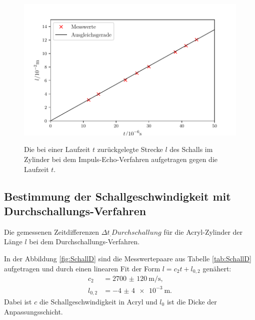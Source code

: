 \begin{figure}
	\centering
	\caption{Die bei einer Laufzeit $t$ zurückgelegte Strecke $l$ des Schalls im Zylinder bei dem Impuls-Echo-Verfahren aufgetragen gegen die Laufzeit $t$.}
	\includegraphics[width=\linewidth-70pt,height=\textheight-70pt,keepaspectratio]{content/images/Schallgeschwindigkeit.pdf}
	\label{fig:SchallIE}
\end{figure}

\subsection{Bestimmung der Schallgeschwindigkeit mit Durchschallungs-Verfahren}

\begin{table}
	\centering
	\caption{Die gemessenen Zeitdifferenzen $\Delta t_.{Durchschallung}$ für die Acryl-Zylinder der Länge $l$ bei dem Durchschallungs-Verfahren.}
	
	\label{tab:SchallD}
\end{table}

\noindent In der Abbildung \ref{fig:SchallD} sind die Messwertepaare aus Tabelle \ref{tab:SchallD} aufgetragen und durch einen linearen Fit der Form $l=c_2 t + l_{0,2}$ genähert:
\begin{align*}
	c_2&=\SI{2700(120)}{\meter\per\second}\text{,}\\
	l_{0,2}&=\SI{-4(4)e-3}{\meter}\text{.}
\end{align*}
Dabei ist $c$ die Schallgeschwindigkeit in Acryl und $l_0$ ist die Dicke der Anpassungsschicht.

